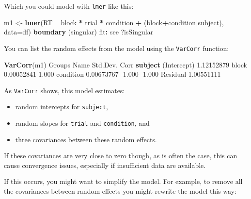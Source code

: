 \documentclass[]{article}
\newenvironment{Shaded}{\begin{snugshade}}{\end{snugshade}}
\newcommand{\DataTypeTok}[1]{\textcolor[rgb]{0.13,0.29,0.53}{#1}}
\newcommand{\FloatTok}[1]{\textcolor[rgb]{0.00,0.00,0.81}{#1}}
\newcommand{\KeywordTok}[1]{\textcolor[rgb]{0.13,0.29,0.53}{\textbf{#1}}}
\newcommand{\NormalTok}[1]{#1}
\newcommand{\OperatorTok}[1]{\textcolor[rgb]{0.81,0.36,0.00}{\textbf{#1}}}
\newcommand{\StringTok}[1]{\textcolor[rgb]{0.31,0.60,0.02}{#1}}
\providecommand{\tightlist}{%
  \setlength{\itemsep}{0pt}\setlength{\parskip}{0pt}}
\begin{document}
Which you could model with \texttt{lmer} like this:

\begin{Shaded}
\begin{Highlighting}[]
\NormalTok{m1 <-}\StringTok{ }\KeywordTok{lmer}\NormalTok{(RT }\OperatorTok{~}\StringTok{ }\NormalTok{block }\OperatorTok{*}\StringTok{ }\NormalTok{trial }\OperatorTok{*}\StringTok{ }\NormalTok{condition }\OperatorTok{+}\StringTok{ }\NormalTok{(block}\OperatorTok{+}\NormalTok{condition}\OperatorTok{|}\NormalTok{subject), }\DataTypeTok{data=}\NormalTok{df)}
\KeywordTok{boundary}\NormalTok{ (singular) fit}\OperatorTok{:}\StringTok{ }\NormalTok{see ?isSingular}
\end{Highlighting}
\end{Shaded}

You can list the random effects from the model using the \texttt{VarCorr} function:

\begin{Shaded}
\begin{Highlighting}[]
\KeywordTok{VarCorr}\NormalTok{(m1)}
\NormalTok{ Groups   Name        Std.Dev.   Corr         }
 \KeywordTok{subject}\NormalTok{  (Intercept) }\FloatTok{1.12152879}              
\NormalTok{          block       }\FloatTok{0.00052841}  \FloatTok{1.000}       
\NormalTok{          condition   }\FloatTok{0.00673767} \FloatTok{-1.000} \FloatTok{-1.000}
\NormalTok{ Residual             }\FloatTok{1.00551111}              
\end{Highlighting}
\end{Shaded}

As \texttt{VarCorr} shows, this model estimates:

\begin{itemize}
\tightlist
\item
  random intercepts for \texttt{subject},
\item
  random slopes for \texttt{trial} and \texttt{condition}, and
\item
  three covariances between these random effects.
\end{itemize}

If these covariances are very close to zero though, as is often the case, this
can cause convergence issues, especially if insufficient data are available.

If this occurs, you might want to simplify the model. For example, to remove all
the covariances between random effects you might rewrite the model this way:
\end{document}
